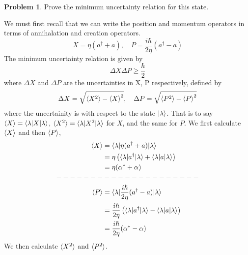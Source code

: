 \documentclass{article}
\theoremstyle{definition}
\newtheorem{definition}{Problem}[section]
\theoremstyle{remark}
\begin{document}
\begin{definition}
    Prove the minimum uncertainty relation for this state.
\end{definition}
We must first recall that we can write the position and momentum operators in terms of annihalation and creation operators.
\begin{equation}
    X = \eta(a^\dagger+a), \quad P = \frac{i\hbar}{2\eta}(a^\dagger-a)
\end{equation}
The minimum uncertainty relation is given by
\begin{equation}
    \Delta X\Delta P \geq \frac{\hbar}{2}
\end{equation}
where $\Delta X$ and $\Delta P$ are the uncertainties in X, P respectively, defined by
\begin{equation}
    \label{eq:uncertainty}
    \Delta X = \sqrt{\braket{X^2}-\braket{X}^2}, \quad \Delta P = \sqrt{\braket{P^2}-\braket{P}^2}
\end{equation}
where the uncertainity is with respect to the state $\ket{\lambda}$. That is to say $\braket{X} = \braket{\lambda|X|\lambda}$, $\braket{X^2} = \braket{\lambda|X^2|\lambda}$ for $X$, and the same for $P$. We first calculate $\braket{X}$ and then $\braket{P}$,
\begin{align*}
    \braket{X} &= \braket{\lambda|\eta(a^\dagger+a)|\lambda}\\
               &= \eta\left(\braket{\lambda|a^\dagger|\lambda}+\braket{\lambda|a|\lambda}\right)\\
               &= \eta(\alpha^*+\alpha)\\
-------&--------------\\
    \braket{P} &= \braket{\lambda|\frac{i\hbar}{2\eta}(a^\dagger-a)|\lambda}\\
               &= \frac{i\hbar}{2\eta}\left(\braket{\lambda|a^\dagger|\lambda}-\braket{\lambda|a|\lambda}\right)\\
               &= \frac{i\hbar}{2\eta}(\alpha^*-\alpha)
\end{align*}
We then calculate $\braket{X^2}$ and $\braket{P^2}$.
\end{document}
